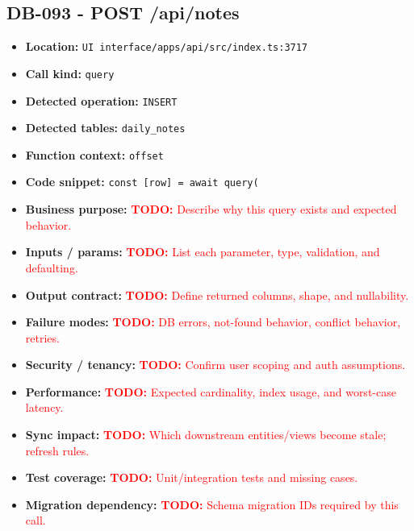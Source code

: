 \documentclass[11pt]{article}
\newcommand{\todoitem}[1]{\textcolor{red}{\textbf{TODO:} #1}}
\begin{document}
\subsection{DB-093 - POST /api/notes}
\begin{itemize}[leftmargin=1.5em]
\item \textbf{Location:} \texttt{UI interface/apps/api/src/index.ts:3717}
\item \textbf{Call kind:} \texttt{query}
\item \textbf{Detected operation:} \texttt{INSERT}
\item \textbf{Detected tables:} \texttt{daily\_notes}
\item \textbf{Function context:} \texttt{offset}
\item \textbf{Code snippet:} \texttt{const [row] = await query(}
\item \textbf{Business purpose:} \todoitem{Describe why this query exists and expected behavior.}
\item \textbf{Inputs / params:} \todoitem{List each parameter, type, validation, and defaulting.}
\item \textbf{Output contract:} \todoitem{Define returned columns, shape, and nullability.}
\item \textbf{Failure modes:} \todoitem{DB errors, not-found behavior, conflict behavior, retries.}
\item \textbf{Security / tenancy:} \todoitem{Confirm user scoping and auth assumptions.}
\item \textbf{Performance:} \todoitem{Expected cardinality, index usage, and worst-case latency.}
\item \textbf{Sync impact:} \todoitem{Which downstream entities/views become stale; refresh rules.}
\item \textbf{Test coverage:} \todoitem{Unit/integration tests and missing cases.}
\item \textbf{Migration dependency:} \todoitem{Schema migration IDs required by this call.}
\end{itemize}
\end{document}
